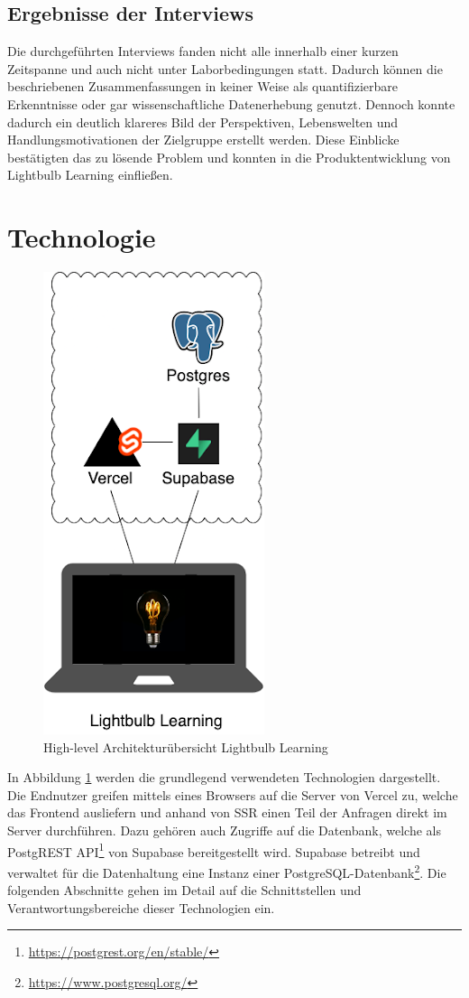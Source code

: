 \subsection{Ergebnisse der Interviews}
Die durchgeführten Interviews fanden nicht alle innerhalb einer kurzen Zeitspanne und auch nicht unter Laborbedingungen statt. Dadurch können die beschriebenen Zusammenfassungen in keiner Weise als quantifizierbare Erkenntnisse oder gar wissenschaftliche Datenerhebung genutzt. Dennoch konnte dadurch ein deutlich klareres Bild der Perspektiven, Lebenswelten und Handlungsmotivationen der Zielgruppe erstellt werden. Diese Einblicke bestätigten das zu lösende Problem und konnten in die Produktentwicklung von Lightbulb Learning einfließen.


\section{Technologie}
\begin{figure}[H]
    \centering
    \includegraphics[width = .3\textwidth]{images/arch.png}
    \caption{High-level Architekturübersicht Lightbulb Learning}
    \label{fig:arch}
\end{figure}

In Abbildung \ref{fig:arch} werden die grundlegend verwendeten Technologien dargestellt. Die Endnutzer greifen mittels eines Browsers auf die Server von Vercel zu, welche das Frontend ausliefern und anhand von SSR einen Teil der Anfragen direkt im Server durchführen. Dazu gehören auch Zugriffe auf die Datenbank, welche als PostgREST API\footnote{\url{https://postgrest.org/en/stable/}} von Supabase bereitgestellt wird. Supabase betreibt und verwaltet für die Datenhaltung eine Instanz einer PostgreSQL-Datenbank\footnote{\url{https://www.postgresql.org/}}. Die folgenden Abschnitte gehen im Detail auf die Schnittstellen und Verantwortungsbereiche dieser Technologien ein.

